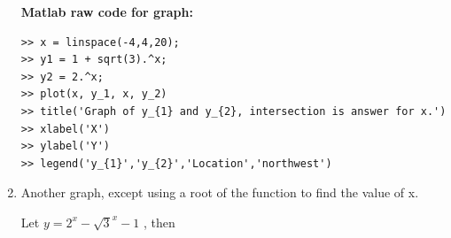 \documentclass[12pt]{article}
\begin{document}
\begin{enumerate}[label=\textbf{\arabic*}.]
\begin{minipage}{.3\linewidth}
\end{minipage}

\textbf{Matlab raw code for graph:}
\begin{verbatim}
>> x = linspace(-4,4,20);
>> y1 = 1 + sqrt(3).^x;
>> y2 = 2.^x;
>> plot(x, y_1, x, y_2)
>> title('Graph of y_{1} and y_{2}, intersection is answer for x.')
>> xlabel('X')
>> ylabel('Y')
>> legend('y_{1}','y_{2}','Location','northwest')
\end{verbatim}


\newpage

\item Another graph, except using a root of the function to find the value of x.

Let $y = 2^{x} - \sqrt{3}^x - 1$ , then 


\end{enumerate}
\end{document}

